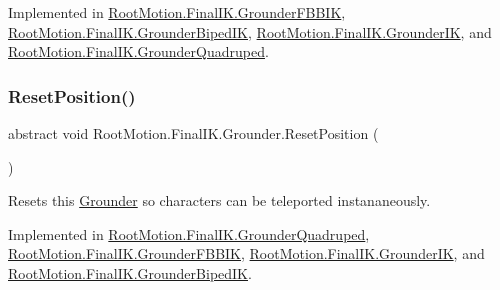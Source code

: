 Implemented in \mbox{\hyperlink{class_root_motion_1_1_final_i_k_1_1_grounder_f_b_b_i_k_a8b63ac0162b00759c2fd31089f30e71b}{Root\+Motion.\+Final\+I\+K.\+Grounder\+F\+B\+B\+IK}}, \mbox{\hyperlink{class_root_motion_1_1_final_i_k_1_1_grounder_biped_i_k_a8e824329a99a8e11da666857d5288ce1}{Root\+Motion.\+Final\+I\+K.\+Grounder\+Biped\+IK}}, \mbox{\hyperlink{class_root_motion_1_1_final_i_k_1_1_grounder_i_k_ae94b6c991b39a6fef2931378121969e7}{Root\+Motion.\+Final\+I\+K.\+Grounder\+IK}}, and \mbox{\hyperlink{class_root_motion_1_1_final_i_k_1_1_grounder_quadruped_a46706210fd77e841924c04b4bf70098b}{Root\+Motion.\+Final\+I\+K.\+Grounder\+Quadruped}}.

\mbox{\label{class_root_motion_1_1_final_i_k_1_1_grounder_aecbd8b5addf2948f4d5fcd00a1b03314}} 
\subsubsection{\texorpdfstring{Reset\+Position()}{ResetPosition()}}
{\footnotesize\ttfamily abstract void Root\+Motion.\+Final\+I\+K.\+Grounder.\+Reset\+Position (\begin{DoxyParamCaption}{ }\end{DoxyParamCaption})\hspace{0.3cm}{\ttfamily [pure virtual]}}



Resets this \mbox{\hyperlink{class_root_motion_1_1_final_i_k_1_1_grounder}{Grounder}} so characters can be teleported instananeously. 



Implemented in \mbox{\hyperlink{class_root_motion_1_1_final_i_k_1_1_grounder_quadruped_a05edde8488de6e2564d75302724dbda7}{Root\+Motion.\+Final\+I\+K.\+Grounder\+Quadruped}}, \mbox{\hyperlink{class_root_motion_1_1_final_i_k_1_1_grounder_f_b_b_i_k_ad901ae9bce541cb70d2913643dda8e82}{Root\+Motion.\+Final\+I\+K.\+Grounder\+F\+B\+B\+IK}}, \mbox{\hyperlink{class_root_motion_1_1_final_i_k_1_1_grounder_i_k_a4a19512898c60ecd027f535198281b8f}{Root\+Motion.\+Final\+I\+K.\+Grounder\+IK}}, and \mbox{\hyperlink{class_root_motion_1_1_final_i_k_1_1_grounder_biped_i_k_ac1056a274304d351106919897e21f57c}{Root\+Motion.\+Final\+I\+K.\+Grounder\+Biped\+IK}}.



